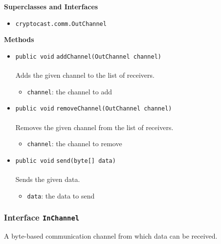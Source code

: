 \textbf{\sffamily Superclasses and Interfaces}
\begin{itemize}
\item \lstinline|cryptocast.comm.OutChannel|
\end{itemize}



\textbf{\sffamily Methods}
\begin{itemize}
\item \lstinline|public void| \lstinline|addChannel|\lstinline|(OutChannel channel)|\\ \\[-0.6em]
Adds the given channel to the list of receivers.
\begin{itemize}
\item \lstinline|channel|: the channel to add
\end{itemize}



\item \lstinline|public void| \lstinline|removeChannel|\lstinline|(OutChannel channel)|\\ \\[-0.6em]
Removes the given channel from the list of receivers.
\begin{itemize}
\item \lstinline|channel|: the channel to remove
\end{itemize}



\item \lstinline|public void| \lstinline|send|\lstinline|(byte[] data)|\\ \\[-0.6em]
Sends the given data.
\begin{itemize}
\item \lstinline|data|: the data to send
\end{itemize}



\end{itemize}

\subsubsection{Interface \lstinline|InChannel|}
A byte-based communication channel from which data can be received. \\
\noindent\begin{minipage}[t]{5cm}
\vspace{0.3em}
\hspace*{2em}
\vspace{0.3em}
\end{minipage}





